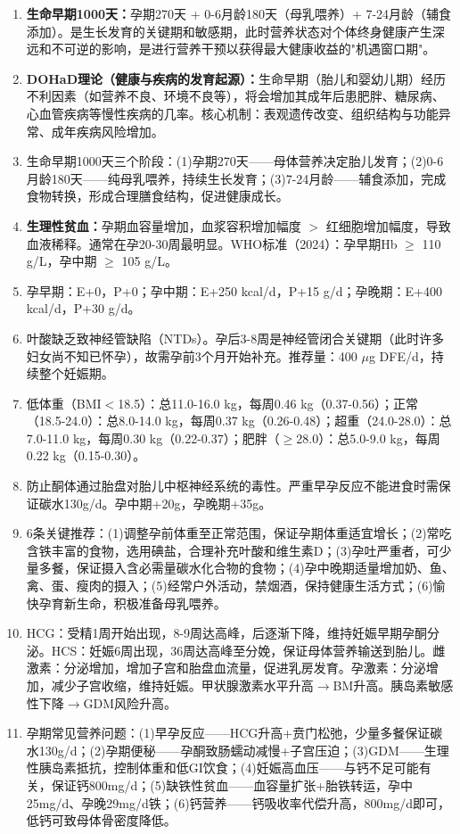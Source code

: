 {\begin{enumerate}[leftmargin=*, itemsep=5pt]
    \item \textbf{生命早期1000天：}孕期270天 + 0-6月龄180天（母乳喂养）+ 7-24月龄（辅食添加）。是生长发育的关键期和敏感期，此时营养状态对个体终身健康产生深远和不可逆的影响，是进行营养干预以获得最大健康收益的"机遇窗口期"。
    \item \textbf{DOHaD理论（健康与疾病的发育起源）：}生命早期（胎儿和婴幼儿期）经历不利因素（如营养不良、环境不良等），将会增加其成年后患肥胖、糖尿病、心血管疾病等慢性疾病的几率。核心机制：表观遗传改变、组织结构与功能异常、成年疾病风险增加。
    \item 生命早期1000天三个阶段：(1)孕期270天——母体营养决定胎儿发育；(2)0-6月龄180天——纯母乳喂养，持续生长发育；(3)7-24月龄——辅食添加，完成食物转换，形成合理膳食结构，促进健康成长。
    \item \textbf{生理性贫血：}孕期血容量增加，血浆容积增加幅度 $>$ 红细胞增加幅度，导致血液稀释。通常在孕20-30周最明显。WHO标准（2024）：孕早期Hb $\geq$ 110 g/L，孕中期 $\geq$ 105 g/L。
    \item 孕早期：E+0，P+0；孕中期：E+250 kcal/d，P+15 g/d；孕晚期：E+400 kcal/d，P+30 g/d。
    \item 叶酸缺乏致神经管缺陷（NTDs）。孕后3-8周是神经管闭合关键期（此时许多妇女尚不知已怀孕），故需孕前3个月开始补充。推荐量：400 $\mu$g DFE/d，持续整个妊娠期。
    \item 低体重（BMI$<$18.5）：总11.0-16.0 kg，每周0.46 kg（0.37-0.56）；正常（18.5-24.0）：总8.0-14.0 kg，每周0.37 kg（0.26-0.48）；超重（24.0-28.0）：总7.0-11.0 kg，每周0.30 kg（0.22-0.37）；肥胖（$\geq$28.0）：总5.0-9.0 kg，每周0.22 kg（0.15-0.30）。
    \item 防止酮体通过胎盘对胎儿中枢神经系统的毒性。严重早孕反应不能进食时需保证碳水130g/d。孕中期+20g，孕晚期+35g。
    \item 6条关键推荐：(1)调整孕前体重至正常范围，保证孕期体重适宜增长；(2)常吃含铁丰富的食物，选用碘盐，合理补充叶酸和维生素D；(3)孕吐严重者，可少量多餐，保证摄入含必需量碳水化合物的食物；(4)孕中晚期适量增加奶、鱼、禽、蛋、瘦肉的摄入；(5)经常户外活动，禁烟酒，保持健康生活方式；(6)愉快孕育新生命，积极准备母乳喂养。
    \item HCG：受精1周开始出现，8-9周达高峰，后逐渐下降，维持妊娠早期孕酮分泌。HCS：妊娠6周出现，36周达高峰至分娩，保证母体营养输送到胎儿。雌激素：分泌增加，增加子宫和胎盘血流量，促进乳房发育。孕激素：分泌增加，减少子宫收缩，维持妊娠。甲状腺激素水平升高$\rightarrow$BM升高。胰岛素敏感性下降$\rightarrow$GDM风险升高。
    \item 孕期常见营养问题：(1)早孕反应——HCG升高+贲门松弛，少量多餐保证碳水130g/d；(2)孕期便秘——孕酮致肠蠕动减慢+子宫压迫；(3)GDM——生理性胰岛素抵抗，控制体重和低GI饮食；(4)妊娠高血压——与钙不足可能有关，保证钙800mg/d；(5)缺铁性贫血——血容量扩张+胎铁转运，孕中25mg/d、孕晚29mg/d铁；(6)钙营养——钙吸收率代偿升高，800mg/d即可，低钙可致母体骨密度降低。

\end{enumerate}}
